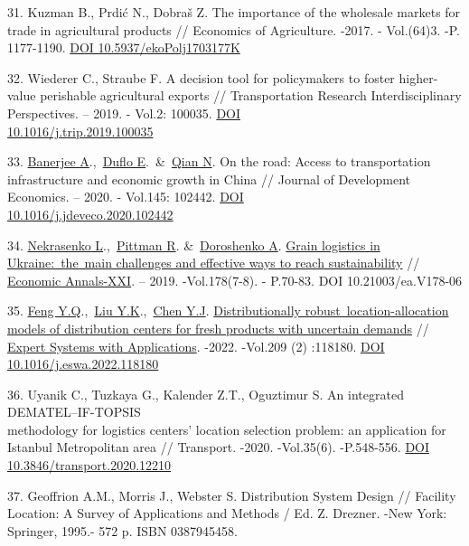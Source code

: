 \begin{references}
31. Kuzman B., Prdić N., Dobraš Z. The importance of the wholesale markets
for trade in agricultural products // Economics of Agriculture. -2017.
- Vol.(64)3. -P. 1177-1190.
\href{https://doi.org/10.5937/ekoPolj1703177K}{DOI
10.5937/ekoPolj1703177K}

32. Wiederer C., Straube F. A decision tool for policymakers to foster
higher-value perishable agricultural exports // Transportation
Research Interdisciplinary Perspectives. -- 2019. - Vol.2: 100035.
\href{https://doi.org/10.1016/j.trip.2019.100035}{DOI\\
10.1016/j.trip.2019.100035}

33. \href{https://www.webofscience.com/wos/author/record/34283995}{Banerjee
A}.,~\href{https://www.webofscience.com/wos/author/record/7546927}{Duflo
E}.~\&~\href{https://www.webofscience.com/wos/author/record/27141385}{Qian
N}. On the road: Access to transportation infrastructure and economic
growth in China // Journal of Development Economics. -- 2020. -
Vol.145: 102442.
\href{https://doi.org/10.1016/j.jdeveco.2020.102442}{DOI\\
10.1016/j.jdeveco.2020.102442}

34. \href{https://www.webofscience.com/wos/author/record/1406264}{Nekrasenko
L}.,~\href{https://www.webofscience.com/wos/author/record/30670921}{Pittman
R}.
\&~\href{https://www.webofscience.com/wos/author/record/29112586}{Doroshenko
A}.
\href{https://www.webofscience.com/wos/woscc/full-record/WOS:000530138400006}{Grain
logistics in Ukraine:~the~main challenges and effective ways to reach
sustainability} // \href{javascript:void(0)}{Economic Annals-XXI}. --
2019. -Vol.178(7-8). - P.70-83. DOI 10.21003/ea.V178-06

35. \href{https://www.webofscience.com/wos/author/record/34864370}{Feng
Y.Q}.,~\href{https://www.webofscience.com/wos/author/record/33997583}{Liu
Y.K}.,~\href{https://www.webofscience.com/wos/author/record/34807908}{Chen
Y.J}.
\href{https://www.webofscience.com/wos/woscc/full-record/WOS:000859686100002}{Distributionally
robust~location-allocation models of distribution centers for fresh
products with uncertain demands} //
\href{https://www.sciencedirect.com/journal/expert-systems-with-applications}{Expert
Systems with Applications}. -2022. -Vol.209 (2) :118180.
\href{https://doi.org/10.1016/j.eswa.2022.118180}{DOI
10.1016/j.eswa.2022.118180}

36. Uyanik C., Tuzkaya G., Kalender Z.T., Oguztimur S. An integrated
DEMATEL--IF-TOPSIS \\methodology for logistics centers' location
selection problem: an application for Istanbul Metropolitan area //
Transport. -2020. -Vol.35(6). -P.548-556.
\href{https://doi.org/10.3846/transport.2020.12210}{DOI
10.3846/transport.2020.12210}

37. Geoffrion A.M., Morris J., Webster S. Distribution System Design //
Facility Location: A Survey of Applications and Methods / Ed. Z.
Drezner. -New York: Springer, 1995.- 572 p. ISBN 0387945458.
\end{references}

